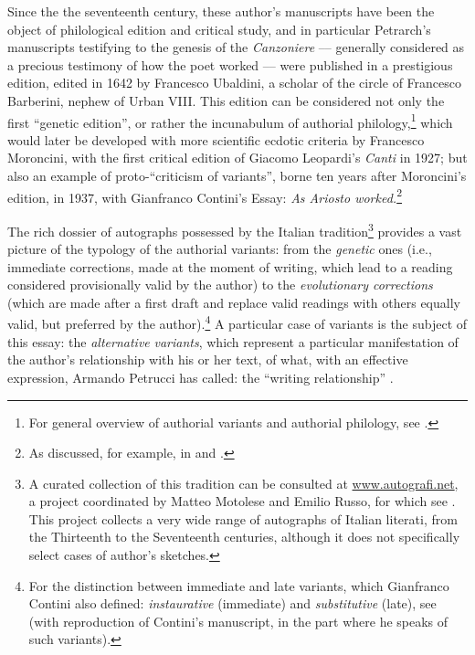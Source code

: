 \begin{paper}
Since the the seventeenth century, these author's manuscripts have been the object of
philological edition and critical study, and in particular Petrarch's
manuscripts testifying to the genesis of the \emph{Canzoniere} –– generally
considered as a precious testimony of how the poet worked –– were published
in a prestigious edition, edited in 1642 by Francesco Ubaldini, a
scholar of the circle of Francesco Barberini, nephew of Urban VIII. This
edition can be considered not only the first ``genetic edition'', or
rather the incunabulum of authorial philology,\footnote{For general
  overview of authorial variants and authorial philology, see \cite{italia_what_2021}.} which would later be
developed with more scientific ecdotic criteria by Francesco Moroncini,
with the first critical edition of Giacomo Leopardi's \emph{Canti}
in 1927; but also an example of proto-``criticism of variants'', borne ten
years after Moroncini's edition, in 1937, with Gianfranco Contini's
Essay: \emph{As Ariosto worked.}\footnote{As discussed, for example, in \cite{brugnolo_incunabula_2021} and \cite{italia_alle_2018}.}

The rich dossier of autographs possessed by the Italian
tradition\footnote{A curated collection of this tradition can be consulted at \url{www.autografi.net}, a project
  coordinated by Matteo Motolese and Emilio Russo, for which see \cite{motolese_autografi_2014}. This project collects a
  very wide range of autographs of Italian literati, from the Thirteenth to the Seventeenth centuries,
  although it does not specifically select cases of author's sketches.}
provides a vast picture of the typology of the authorial variants: from
the \emph{genetic} ones (i.e., immediate corrections, made at the moment
of writing, which lead to a reading considered provisionally valid by
the author) to the \emph{evolutionary corrections} (which are made after
a first draft and replace valid readings with others equally valid, but
preferred by the author).\footnote{For the distinction between immediate
  and late variants, which Gianfranco Contini also defined:
  \emph{instaurative} (immediate) and \emph{substitutive} (late), see \cite{italia_alle_nodate} (with reproduction of Contini's manuscript, in the part
  where he speaks of such variants).} A particular case of variants is
the subject of this essay: the \emph{alternative} \emph{variants}, which
represent a particular manifestation of the author's relationship with
his or her text, of what, with an effective expression, Armando Petrucci
has called: the ``writing relationship'' \parencite[63--64]{petrucci_letteratura_2017}.


\end{paper}
